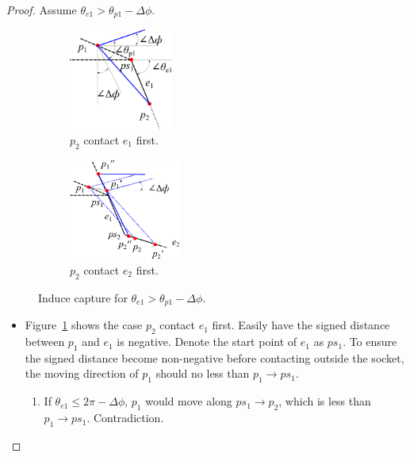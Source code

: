\documentclass[11pt, twocolumn]{article}
\begin{document}
\begin{proof}

Assume $\theta_{e1} > \theta_{p1} - \Delta\phi$.

\begin{figure}[h]
\begin{center}
\begin{subfigure}{0.24\textwidth}
\begin{center}
\includegraphics[height=1.3in]{figures/proof_1.png}
\end{center}
\caption{ $p_2$ contact $e_1$ first. }
\label{fig:proof_1}
\end{subfigure}
\begin{subfigure}{0.24\textwidth}
\begin{center}
\includegraphics[height=1.3in]{figures/proof_2.png}
\end{center}
\caption{$p_2$ contact $e_2$ first. }
\label{fig:proof_2}
\end{subfigure}
\end{center}
\caption{Induce capture for $\theta_{e1} > \theta_{p1} - \Delta\phi$. }
\label{fig:proof}
\end{figure}
 
\begin{itemize}

\item Figure~\ref{fig:proof_1} shows the case $p_2$ contact $e_1$ first. Easily have the signed distance between $p_1$ and $e_1$ is negative. Denote the start point of $e_1$ as $ps_1$. To ensure the signed distance become non-negative before contacting outside the socket, the moving direction of $p_1$ should no less than $p_1 \to ps_1$.

\begin{enumerate}
\item If $\theta_{e1} \le 2\pi - \Delta\phi$, $p_1$ would move along $ps_1 \to p_2$, which is less than $p_1 \to ps_1$. Contradiction.


\end{enumerate}
\end{itemize}
\end{proof}
\end{document}
